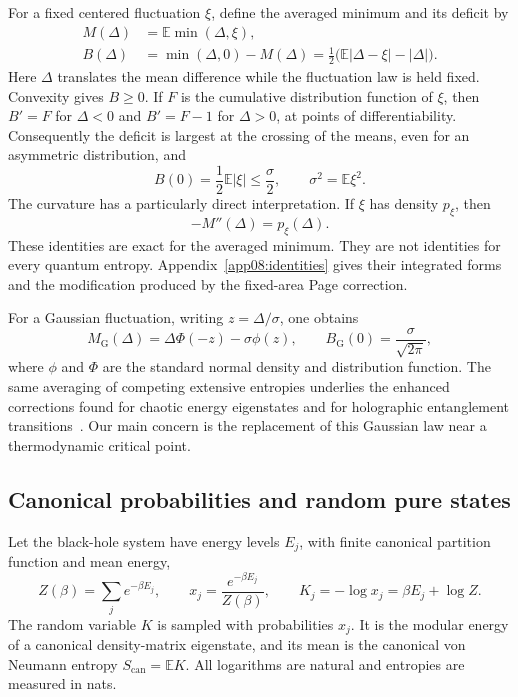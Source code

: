 \documentclass[11pt,letterpaper]{article}
\newcommand{\E}{\mathbb{E}}
\theoremstyle{plain}
\theoremstyle{definition}
\theoremstyle{remark}
\begin{document}
For a fixed centered fluctuation $\xi$, define the averaged minimum and its deficit by
\begin{align}
 M(\Delta)&=\E\min(\Delta,\xi),
 \label{eq02:averaged_minimum}\\
 B(\Delta)&=\min(\Delta,0)-M(\Delta)
 =\frac12\bigl(\E|\Delta-\xi|-|\Delta|\bigr).
 \label{eq02:deficit}
\end{align}
Here $\Delta$ translates the mean difference while the fluctuation law is held fixed. Convexity gives $B\geq0$. If $F$ is the cumulative distribution function of $\xi$, then $B'=F$ for $\Delta<0$ and $B'=F-1$ for $\Delta>0$, at points of differentiability. Consequently the deficit is largest at the crossing of the means, even for an asymmetric distribution, and
\begin{equation}
 B(0)=\frac12\E|\xi|\leq\frac{\sigma}{2},
 \qquad \sigma^2=\E\xi^2.
 \label{eq02:central_deficit}
\end{equation}
The curvature has a particularly direct interpretation. If $\xi$ has density $p_\xi$, then
\begin{equation}
 -M''(\Delta)=p_\xi(\Delta).
 \label{eq02:curvature}
\end{equation}
These identities are exact for the averaged minimum. They are not identities for every quantum entropy. Appendix~\ref{app08:identities} gives their integrated forms and the modification produced by the fixed-area Page correction.

For a Gaussian fluctuation, writing $z=\Delta/\sigma$, one obtains
\begin{equation}
 M_{\mathrm G}(\Delta)=\Delta\Phi(-z)-\sigma\phi(z),
 \qquad B_{\mathrm G}(0)=\frac{\sigma}{\sqrt{2\pi}},
 \label{eq02:gaussian}
\end{equation}
where $\phi$ and $\Phi$ are the standard normal density and distribution function. The same averaging of competing extensive entropies underlies the enhanced corrections found for chaotic energy eigenstates and for holographic entanglement transitions~\cite{murthysrednicki2019,marolfwangwang2020,dongwang2020}. Our main concern is the replacement of this Gaussian law near a thermodynamic critical point.

\subsection{Canonical probabilities and random pure states}

Let the black-hole system have energy levels $E_j$, with finite canonical partition function and mean energy,
\begin{equation}
 Z(\beta)=\sum_j e^{-\beta E_j},\qquad
 x_j=\frac{e^{-\beta E_j}}{Z(\beta)},\qquad
 K_j=-\log x_j=\beta E_j+\log Z.
 \label{eq02:canonical_levels}
\end{equation}
The random variable $K$ is sampled with probabilities $x_j$. It is the modular energy of a canonical density-matrix eigenstate, and its mean is the canonical von Neumann entropy $S_{\mathrm{can}}=\E K$. All logarithms are natural and entropies are measured in nats.
\end{document}
